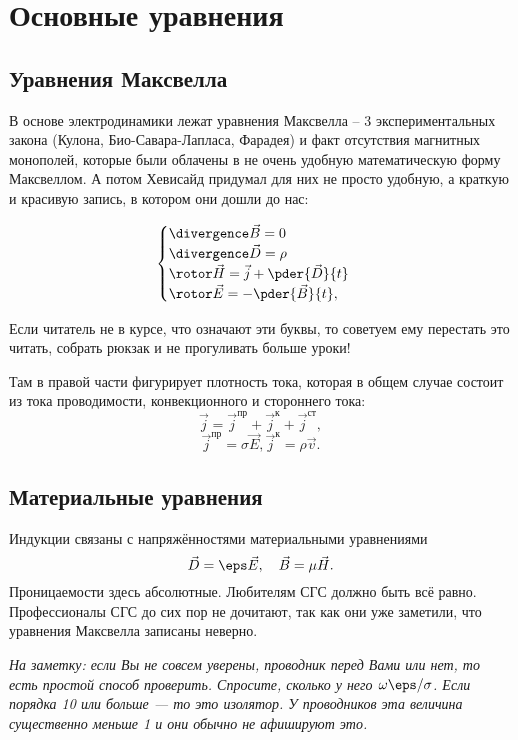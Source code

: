 \chapter{Основные уравнения}
\section{Уравнения Максвелла}
    В основе электродинамики лежат уравнения Максвелла -- 3 экспериментальных
    закона (Кулона, Био-Савара-Лапласа, Фарадея) и факт отсутствия магнитных
    монополей, которые были облачены в не очень удобную математическую форму
    Максвеллом. А потом Хевисайд придумал для них не просто удобную, а краткую и
    красивую запись, в котором они дошли до нас:

    \[
      \begin{cases}
        \divergence \vec{B} = 0\\
        \divergence\vec{D} = \rho\\
        \rotor\vec{H} = \vec{j} + \pder{\vec{D}}{t}\\
        \rotor\vec{E} = -\pder{\vec{B}}{t},
      \end{cases}
    \]

    Если читатель не в курсе, что означают эти буквы, то советуем ему перестать
    это читать, собрать рюкзак и не прогуливать больше уроки!

    Там в правой части фигурирует плотность тока, которая в общем случае состоит
    из тока проводимости, конвекционного и стороннего тока:
    \[
        \vec{j} = \vec{j}^\text{пр} + \vec{j}^\text{к} + \vec{j}^\text{ст},
    \]
    \[
        \vec{j}^\text{пр} = \sigma\vec{E}, \vec{j}^\text{к} = \rho\vec{v}.
    \]

\section{Материальные уравнения}
    Индукции связаны с напряжённостями материальными уравнениями
    \[
        \vec{D} = \eps\vec{E},\quad
        \vec{B} = \mu\vec{H}.
    \]
    Проницаемости здесь абсолютные. Любителям СГС должно быть всё равно.
    Профессионалы СГС до сих пор не дочитают, так как они уже заметили,
    что уравнения Максвелла записаны неверно.

    \textit{На заметку: если Вы не совсем уверены, проводник перед Вами или нет, то есть
    простой способ проверить. Спросите, сколько у него \(\omega\eps/\sigma\).
    Если порядка 10 или больше --- то это изолятор. У проводников эта величина
    существенно меньше 1 и они обычно не афишируют это.}

